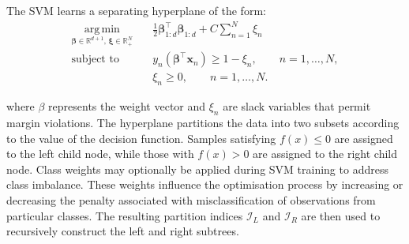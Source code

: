 \begin{algorithm}[H]
\caption{Binary Classification Split}
\label{alg:binary-split}


\end{algorithm}

The SVM learns a separating hyperplane of the form:
\[
\begin{aligned}
\operatorname*{arg\,min}_{\boldsymbol{\beta}\in\mathbb{R}^{d+1},\,\boldsymbol{\xi}\in\mathbb{R}_{+}^{N}}
\quad &
\frac{1}{2}\boldsymbol{\beta}_{1:d}^{\top}\boldsymbol{\beta}_{1:d}
+ C\sum_{n=1}^{N}\xi_n \\
\text{subject to}\quad &
y_n\left(\boldsymbol{\beta}^{\top}\mathbf{x}_n\right)\geq 1-\xi_n,
\qquad n=1,\ldots,N, \\
&
\xi_n \geq 0,
\qquad n=1,\ldots,N.
\end{aligned}
\]

where \({\beta}\) represents the weight vector and \(\xi_n\) are slack variables that permit margin violations. The hyperplane partitions the data into two subsets according to the value of the decision function. Samples satisfying \(f({x}) \leq 0\) are assigned to the left child node, while those with \(f({x}) > 0\) are assigned to the right child node. Class weights may optionally be applied during SVM training to address class imbalance. These weights influence the optimisation process by increasing or decreasing the penalty associated with misclassification of observations from particular classes. The resulting partition indices \(\mathcal{I}_L\) and \(\mathcal{I}_R\) are then used to recursively construct the left and right subtrees.

